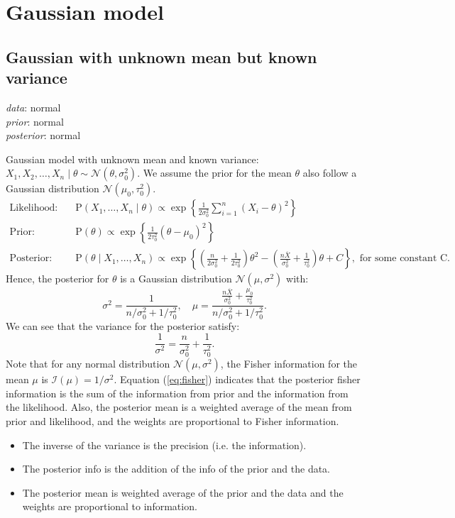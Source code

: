 \documentclass[twoside]{article}
\begin{document}
\section{Gaussian model}

\subsection{Gaussian with unknown mean but known variance}

\textit{data}: normal \\ 
\textit{prior}: normal  \\
\textit{posterior}: normal  

Gaussian model with unknown mean and known variance: $X_1,X_2,\ldots,X_n \mid
\theta \sim \mathcal{N}(\theta,\sigma_0^2)$. We assume the prior for the mean $\theta$ also follow a Gaussian distribution $\mathcal{N}(\mu_0,\tau_0^2)$.
\begin{align*}
\text{Likelihood}:\quad &\mathrm{P}(X_1,\ldots,X_n\mid \theta) \propto \exp{\left\{\frac{1}{2\sigma_0^2}\sum_{i=1}^n (X_i-\theta)^2\right\}}\\
\text{Prior}:\quad &\text{P}(\theta) \propto \exp{\left\{\frac{1}{2\tau_0^2}(\theta-\mu_0)^2\right\}}\\
\text{Posterior}:\quad &\text{P}(\theta\mid X_1,\ldots,X_n) \propto \exp{\left\{\left(\frac{n}{2\sigma_0^2}+\frac{1}{2\tau_0^2}\right)\theta^2 - \left(\frac{n\overline{X}}{\sigma_0^2}+\frac{1}{\tau_0^2}\right)\theta + C\right\}}, \text{ for some constant C.}
\end{align*}
Hence, the posterior for $\theta$ is a Gaussian distribution $\mathcal{N}(\mu,\sigma^2)$ with:
\[
\sigma^2 = \frac{1}{n/\sigma_0^2+1/\tau_0^2},\quad \mu = \frac{\frac{n\overline{X}}{\sigma_0^2}+\frac{\mu_0}{\tau_0^2}}{n/\sigma_0^2+1/\tau_0^2}.
\]
We can see that the variance for the posterior satisfy:
\begin{equation}
\label{eq:fisher}
\frac{1}{\sigma^2} = \frac{n}{\sigma_0^2}+\frac{1}{\tau_0^2}.
\end{equation}
Note that for any normal distribution $\mathcal{N}(\mu,\sigma^2)$, the Fisher information for the mean $\mu$ is $\mathcal{I}(\mu) = 1/\sigma^2$. Equation (\ref{eq:fisher}) indicates that the posterior fisher information is the sum of the information from prior and the information from the likelihood. Also, the posterior mean is a weighted average of the mean from prior and likelihood, and the weights are proportional to Fisher information. 

\begin{itemize}
    \item The inverse of the variance is the precision (i.e. the information).
    \item The posterior info is the addition of the info of the prior and the
        data.
    \item The posterior mean is weighted average of the prior and the data and
        the weights are proportional to information.
\end{itemize}
\end{document}
